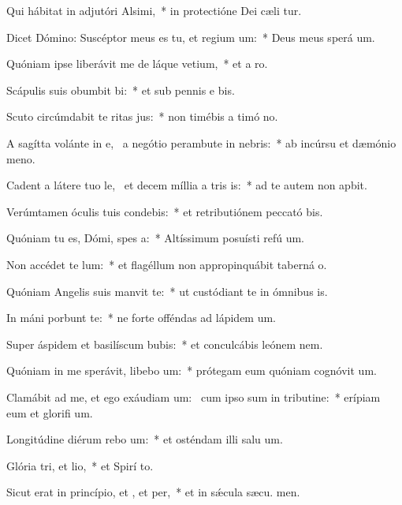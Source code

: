 \item Qui hábitat in adjutóri Alsimi,~* in protectióne Dei cæli tur.
\item Dicet Dómino: Suscéptor meus es tu, et regium um:~* Deus meus sperá  um.
\item Quóniam ipse liberávit me de láque vetium,~* et a  ro.
\item Scápulis suis obumbit bi:~* et sub pennis e bis.
\item Scuto circúmdabit te ritas jus:~* non timébis a timó no.
\item A sagítta volánte in e,~\pscross{} a negótio perambute in nebris:~* ab incúrsu et dæmónio meno.
\item Cadent a látere tuo le,~\pscross{} et decem míllia a tris is:~* ad te autem non apbit.
\item Verúmtamen óculis tuis condebis:~* et retributiónem peccató bis.
\item Quóniam tu es, Dómi, spes a:~* Altíssimum posuísti refú um.
\item Non accédet  te lum:~* et flagéllum non appropinquábit taberná o.
\item Quóniam Angelis suis manvit  te:~* ut custódiant te in ómnibus  is.
\item In máni porbunt te:~* ne forte offéndas ad lápidem  um.
\item Super áspidem et basilíscum bubis:~* et conculcábis leónem  nem.
\item Quóniam in me sperávit, libebo um:~* prótegam eum quóniam cognóvit  um.
\item Clamábit ad me, et ego exáudiam um:~\pscross{} cum ipso sum in tributine:~* erípiam eum et glorifi um.
\item Longitúdine diérum rebo um:~* et osténdam illi salu um.
\item Glória tri, et lio,~* et Spirí to.
\item Sicut erat in princípio, et , et per,~* et in sǽcula sæcu. men.
